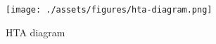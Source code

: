 \begin{landscape}
    \begin{figure}[p]
        \centering
        \texttt{[image: ./assets/figures/hta-diagram.png]}
        \captionsetup{justification=centering}
        \caption{HTA diagram}
        \label{fig:hta}
    \end{figure}
\end{landscape}
